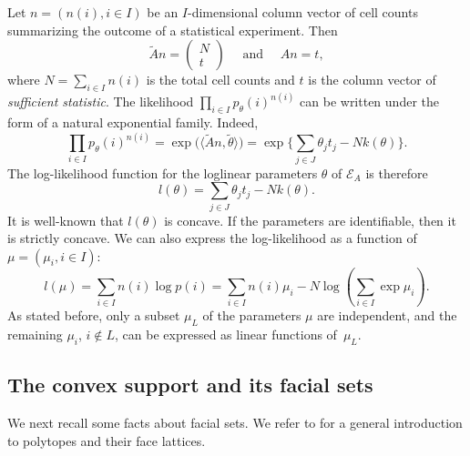 \documentclass[aos,noinfoline]{imsart}
\def\t{\theta}
\newcommand{\Ecal}{\mathcal{E}}
\newcommand{\Pbf}{\mathbf{P}}
\theoremstyle{remark}
\theoremstyle{definition}
\begin{document}
Let $n=(n(i),i\in I)$ be an $I$-di\-men\-sional column vector of cell counts summarizing the outcome of a statistical experiment.
Then
\begin{equation}
  \label{marginal}
  \tilde{A}n=\left(\begin{array}{c}N\\t\end{array}\right)
  \quad\text{ and }\quad
  A n= t,
\end{equation}
where $N=\sum_{i\in I}n(i)$ is the total cell counts and $t$ is the column vector of \emph{sufficient statistic}.  The
likelihood $\prod_{i\in I}p_{\theta}(i)^{n(i)}$ can be written under the form of a natural exponential family.  Indeed,
\begin{equation*}
  \prod_{i\in I}p_{\theta}(i)^{n(i)}
  = \exp\big( \big\langle \tilde{A}n, \tilde{\theta}\big\rangle\big) = \exp\big\{\sum_{j\in J}\theta_jt_j - N k(\theta)\big\}.
\end{equation*}
The log-likelihood function for the loglinear parameters $\theta$ of $\Ecal_{A}$ is therefore
\begin{equation}
  \label{lik-theta}
  l(\theta)=%
  \sum_{j\in J}\theta_jt_j-N k(\theta) .
\end{equation}
It is well-known that $l(\theta)$ is concave.  If the parameters are identifiable, then it is strictly concave.
We can also express the log-likelihood as a function %
of $\mu=(\mu_i, i\in I)$:
\begin{equation}
  l(\mu ) = \sum_{i\in I}n(i)\log p(i) = \sum_{i\in I}n(i)\mu_i-N\log (\sum_{i\in I}\exp \mu_i)    \label{lik-mu}.
\end{equation}
As stated before, only a subset $\mu_{L}$ of the parameters $\mu$ are independent, and the remaining $\mu_{i}$, $i\notin
L$, can be expressed as linear functions of~$\mu_{L}$.


\subsection{The convex support and its facial sets}
\label{sec:polytopes}

We next recall some facts about facial sets.  We refer to \citet{Ziegler98:Lectures_on_Polytopes} for a general
introduction to polytopes and their face lattices.
\end{document}
